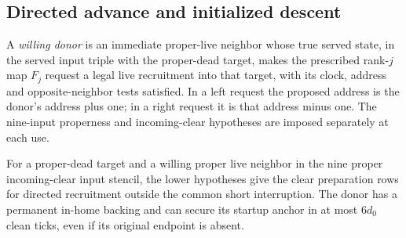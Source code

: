 \subsection{Directed advance and initialized descent}
A \emph{willing donor} is an immediate proper-live neighbor whose true served state, in the served input triple with the proper-dead target, makes the prescribed rank-\(j\) map \(F_j\) request a legal live recruitment into that target, with its clock, address and opposite-neighbor tests satisfied. In a left request the proposed address is the donor's address plus one; in a right request it is that address minus one. The nine-input properness and incoming-clear hypotheses are imposed separately at each use.
\begin{lemma}\label{lem:startup}
For a proper-dead target and a willing proper live neighbor in the nine proper incoming-clear input stencil, the lower hypotheses give the clear preparation rows for directed recruitment outside the common short interruption. The donor has a permanent in-home backing and can secure its startup anchor in at most \(6d_0\) clean ticks, even if its original endpoint is absent.
\end{lemma}
